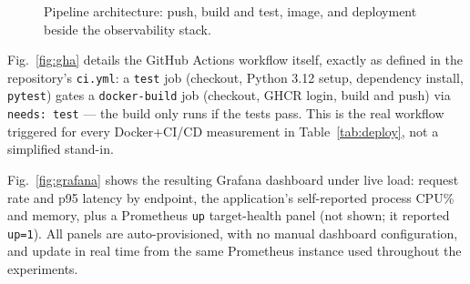 \documentclass[conference]{IEEEtran}
\begin{document}
\begin{figure}[t]
\centering
{}
\caption{Pipeline architecture: push, build and test, image, and deployment beside the observability stack.}
\label{fig:arch}
\end{figure}

Fig.~\ref{fig:gha} details the GitHub Actions workflow itself, exactly as
defined in the repository's \texttt{ci.yml}: a \texttt{test} job (checkout,
Python 3.12 setup, dependency install, \texttt{pytest}) gates a
\texttt{docker-build} job (checkout, GHCR login, build and push) via
\texttt{needs: test} — the build only runs if the tests pass. This is the
real workflow triggered for every Docker+CI/CD measurement in
Table~\ref{tab:deploy}, not a simplified stand-in.



Fig.~\ref{fig:grafana} shows the resulting Grafana dashboard under live
load: request rate and p95 latency by endpoint, the application's
self-reported process CPU\% and memory, plus a Prometheus \texttt{up}
target-health panel (not shown; it reported \texttt{up=1}). All panels are
auto-provisioned, with no manual dashboard configuration, and update in real time from
the same Prometheus instance used throughout the experiments.
\end{document}
